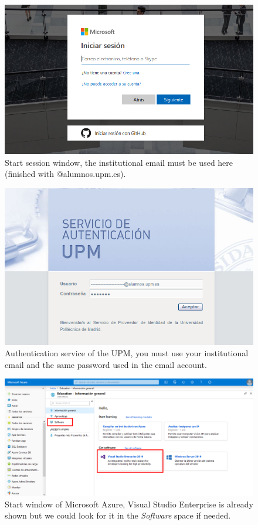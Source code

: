 \begin{figure}
    \centering
    \includegraphics[width= \textwidth]{Figures/ExtraB}
    \caption{Start session window, the institutional email must be used here (finished with @alumnos.upm.es).}
    \label{fig:ExtraB}
\end{figure}

\begin{figure}
    \centering
    \includegraphics[width= \textwidth]{Figures/ExtraC}
    \caption{Authentication service of the UPM, you must use your institutional email and the same password used in the email account.}
    \label{fig:ExtraC}
\end{figure}

\begin{figure}
    \centering
    \includegraphics[width= \textwidth]{Figures/ExtraD}
    \caption{Start window of Microsoft Azure, Visual Studio Enterprise is already shown but we could look for it in the \textit{Software} space if needed.}
    \label{fig:ExtraD}
\end{figure}

